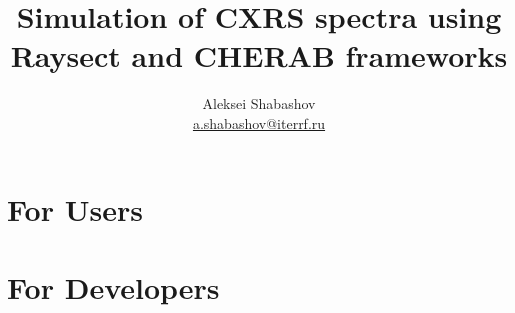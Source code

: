 \documentclass[a4paper,12pt,titlepage,english,draft]{article}
\title{Simulation of CXRS spectra using Raysect and CHERAB frameworks}
\author{Aleksei Shabashov \\ \href{mailto:a.shabashov@iterrf.ru}{a.shabashov@iterrf.ru}}
\date{}
\begin{document}
\maketitle
\tableofcontents%

% 

% 

% 

% 

% 

% 

\printbibliography%

\begin{appendices}
    \section{For Users}%
    \label{app:users}
    

    \section{For Developers}%
    \label{app:developers}
    
\end{appendices}
\end{document}
